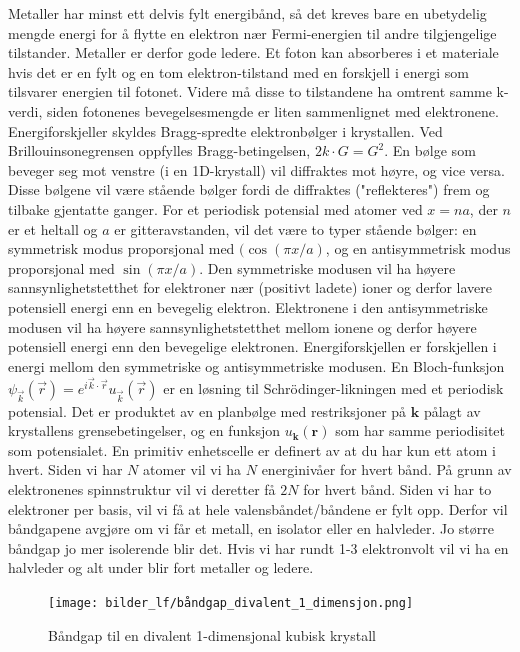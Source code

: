 \documentclass{article}
\begin{document}
Metaller har minst ett delvis fylt energibånd, så det kreves bare en ubetydelig mengde energi for å flytte en elektron nær Fermi-energien til andre tilgjengelige tilstander. Metaller er derfor gode ledere.
 Et foton kan absorberes i et materiale hvis det er en fylt og en tom elektron-tilstand med en forskjell i energi som tilsvarer energien til fotonet. Videre må disse to tilstandene ha omtrent samme k-verdi, siden fotonenes bevegelsesmengde er liten sammenlignet med elektronene.
Energiforskjeller skyldes Bragg-spredte elektronbølger i krystallen. Ved Brillouinsonegrensen oppfylles Bragg-betingelsen, $2k \cdot G = G^2$. En bølge som beveger seg mot venstre (i en 1D-krystall) vil diffraktes mot høyre, og vice versa. Disse bølgene vil være stående bølger fordi de diffraktes ("reflekteres") frem og tilbake gjentatte ganger. For et periodisk potensial med atomer ved $x = na$, der $n$ er et heltall og $a$ er gitteravstanden, vil det være to typer stående bølger: en symmetrisk modus proporsjonal med $(\cos(\pi x/a)$, og en antisymmetrisk modus proporsjonal med $\sin(\pi x/a)$. Den symmetriske modusen vil ha høyere sannsynlighetstetthet for elektroner nær (positivt ladete) ioner og derfor lavere potensiell energi enn en bevegelig elektron. Elektronene i den antisymmetriske modusen vil ha høyere sannsynlighetstetthet mellom ionene og derfor høyere potensiell energi enn den bevegelige elektronen. Energiforskjellen er forskjellen i energi mellom den symmetriske og antisymmetriske modusen.
En Bloch-funksjon $\psi_{\vec{k}}(\vec{r}) = e^{i\vec{k}\cdot\vec{r}} u_{\vec{k}}(\vec{r})$ er en løsning til Schrödinger-likningen med et periodisk potensial. Det er produktet av en planbølge med restriksjoner på $\mathbf{k}$ pålagt av krystallens grensebetingelser, og en funksjon $u_{\mathbf{k}}(\mathbf{r})$ som har samme periodisitet som potensialet.
En primitiv enhetscelle er definert av at du har kun ett atom i hvert. Siden vi har $N$ atomer vil vi ha $N$ energinivåer for hvert bånd. På grunn av elektronenes spinnstruktur vil vi deretter få $2N$ for hvert bånd.
Siden vi har to elektroner per basis, vil vi få at hele valensbåndet/båndene er fylt opp. Derfor vil båndgapene avgjøre om vi får et metall, en isolator eller en halvleder. Jo større båndgap jo mer isolerende blir det. Hvis vi har rundt 1-3 elektronvolt vil vi ha en halvleder og alt under blir fort metaller og ledere.
\begin{figure}[H]
    \centering
    \texttt{[image: bilder\_lf/båndgap\_divalent\_1\_dimensjon.png]}
    \caption{Båndgap til en divalent 1-dimensjonal kubisk krystall}
    \label{fig:båndgap_divalent_1_dimensjon}
\end{figure}
\end{document}
